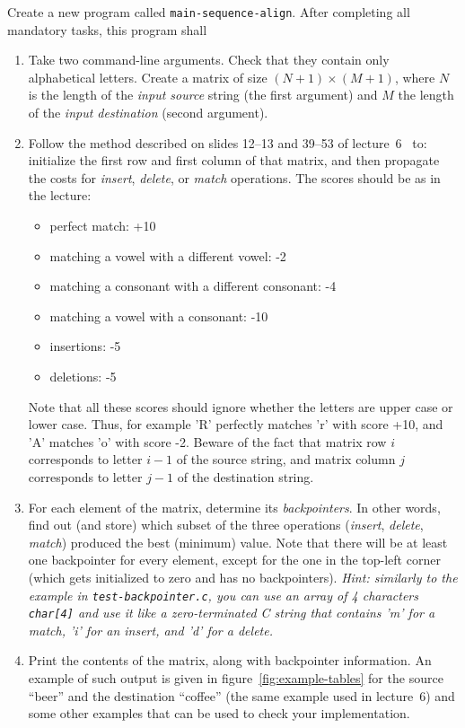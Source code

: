 \documentclass[a4paper,10pt]{article}
\begin{document}
Create a new program called \texttt{main-sequence-align}.
After completing all mandatory tasks, this program shall

\begin{enumerate}
\item
  Take two command-line arguments.
  Check that they contain only alphabetical letters.
  Create a matrix of size $(N+1)\times(M+1)$, where $N$ is the length of the \emph{input source} string (the first argument) and $M$ the length of the \emph{input destination} (second argument).
\item
  Follow the method described on slides 12--13 and 39--53 of lecture~6~\cite{lecture6} to: initialize the first row and first column of that matrix, and then propagate the costs for \emph{insert}, \emph{delete}, or \emph{match} operations.
  The scores should be as in the lecture:
  \begin{itemize}
  \item
    perfect match: +10
  \item
    matching a vowel with a different vowel: -2
  \item
    matching a consonant with a different consonant: -4
  \item
    matching a vowel with a consonant: -10
  \item
    insertions: -5
  \item
    deletions: -5
  \end{itemize}
  Note that all these scores should ignore whether the letters are upper case or lower case.
  Thus, for example 'R' perfectly matches 'r' with score +10, and 'A' matches 'o' with score -2.
  Beware of the fact that matrix row $i$ corresponds to letter $i-1$ of the source string, and matrix column $j$ corresponds to letter $j-1$ of the destination string.
\item
  For each element of the matrix, determine its \emph{backpointers}.
  In other words, find out (and store) which subset of the three operations (\emph{insert}, \emph{delete}, \emph{match}) produced the best (minimum) value.
  Note that there will be at least one backpointer for every element, except for the one in the top-left corner (which gets initialized to zero and has no backpointers).
  \emph{Hint: similarly to the example in \texttt{test-backpointer.c}, you can use an array of 4 characters \texttt{char[4]} and use it like a zero-terminated C string that contains 'm' for a match, 'i' for an insert, and 'd' for a delete.}
\item
  Print the contents of the matrix, along with backpointer information.
  An example of such output is given in figure~\ref{fig:example-tables} for the source ``beer'' and the destination ``coffee'' (the same example used in lecture~6) and some other examples that can be used to check your implementation.
\end{enumerate}
\end{document}
